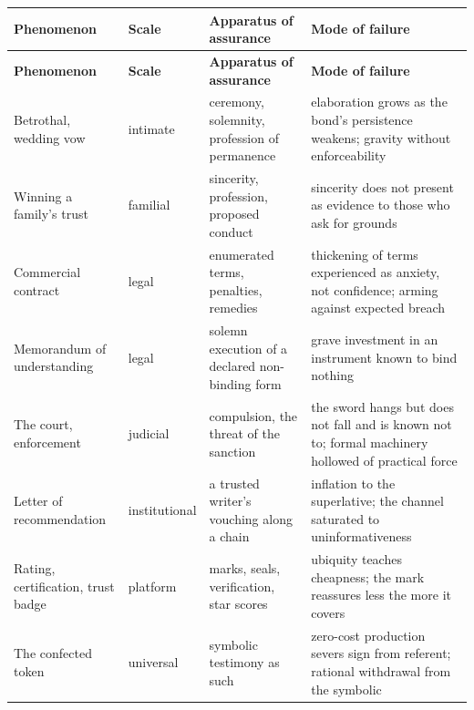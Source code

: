 \begin{center}
\small
\renewcommand{\arraystretch}{1.35}
\begin{longtable}{>{\RaggedRight\arraybackslash}p{2.7cm} >{\RaggedRight\arraybackslash}p{2.2cm} >{\RaggedRight\arraybackslash}p{3.2cm} >{\RaggedRight\arraybackslash}p{3.4cm}}
\toprule
\textcolor{rosedeep}{\textbf{\small Phenomenon}} & \textcolor{rosedeep}{\textbf{\small Scale}} & \textcolor{rosedeep}{\textbf{\small Apparatus of assurance}} & \textcolor{rosedeep}{\textbf{\small Mode of failure}} \\
\midrule
\endfirsthead
\toprule
\textcolor{rosedeep}{\textbf{\small Phenomenon}} & \textcolor{rosedeep}{\textbf{\small Scale}} & \textcolor{rosedeep}{\textbf{\small Apparatus of assurance}} & \textcolor{rosedeep}{\textbf{\small Mode of failure}} \\
\midrule
\endhead
\bottomrule
\endfoot
Betrothal, wedding vow & intimate & ceremony, solemnity, profession of permanence & elaboration grows as the bond's persistence weakens; gravity without enforceability \\
Winning a family's trust & familial & sincerity, profession, proposed conduct & sincerity does not present as evidence to those who ask for grounds \\
Commercial contract & legal & enumerated terms, penalties, remedies & thickening of terms experienced as anxiety, not confidence; arming against expected breach \\
Memorandum of understanding & legal & solemn execution of a declared non-binding form & grave investment in an instrument known to bind nothing \\
The court, enforcement & judicial & compulsion, the threat of the sanction & the sword hangs but does not fall and is known not to; formal machinery hollowed of practical force \\
Letter of recommendation & institutional & a trusted writer's vouching along a chain & inflation to the superlative; the channel saturated to uninformativeness \\
Rating, certification, trust badge & platform & marks, seals, verification, star scores & ubiquity teaches cheapness; the mark reassures less the more it covers \\
The confected token & universal & symbolic testimony as such & zero-cost production severs sign from referent; rational withdrawal from the symbolic \\
\end{longtable}
\end{center}

